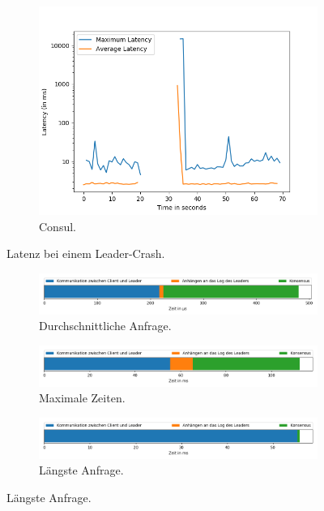 \begin{figure}[t]
\begin{subfigure}[t]{0.45\textwidth}
		\includegraphics[width=\textwidth]{img/leader_crash_consul.png}
		\caption{Consul.}
	\end{subfigure}
	\caption{Latenz bei einem Leader-Crash.}
\end{figure}

\begin{figure}[t]
	\centering
	\begin{subfigure}[t]{1\textwidth}
		\includegraphics[width=\textwidth]{img/request_avg_timing.png}
		\caption{Durchschnittliche Anfrage.}
	\end{subfigure}
	\begin{subfigure}[t]{1\textwidth}
		\includegraphics[width=\textwidth]{img/request_max_timing.png}
		\caption{Maximale Zeiten.}
	\end{subfigure}
	\begin{subfigure}[t]{1\textwidth}
		\includegraphics[width=\textwidth]{img/request_longest_timing.png}
		\caption{Längste Anfrage.}
	\end{subfigure}
\end{figure}